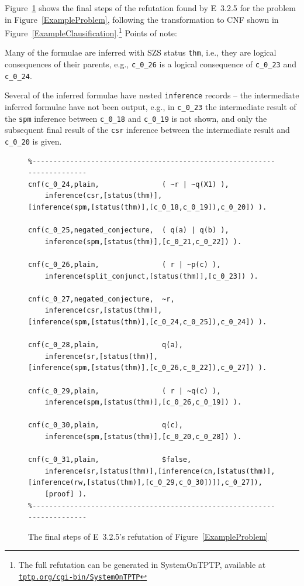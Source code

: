 \documentclass{ceurart}
\newcommand{\smalltt}[1]{\small \texttt{#1}}
\newenvironment{packed_itemize}{
\vspace*{-0.3em}
\begin{itemize}
\setlength{\partopsep}{0pt}
\setlength{\itemsep}{1pt}
\setlength{\parskip}{0pt}
\setlength{\parsep}{0pt}
}{\end{itemize}}
\begin{document}
Figure~\ref{ExampleDerivation} shows the final steps of the refutation found by E~3.2.5 for the
problem in Figure~\ref{ExampleProblem}, following the transformation to CNF shown in 
Figure~\ref{ExampleClausification}.\footnote{%
The full refutation can be generated in SystemOnTPTP, available at
\href{https://tptp.org/cgi-bin/SystemOnTPTP}{\tt tptp.org/cgi-bin/SystemOnTPTP}}
Points of note:
\begin{packed_itemize}
\item Many of the formulae are inferred with SZS status \smalltt{thm}, i.e., they are logical 
      consequences of their parents, e.g., \smalltt{c\_0\_26} is a logical consequence of
      \smalltt{c\_0\_23} and \smalltt{c\_0\_24}.
\item Several of the inferred formulae have nested \smalltt{inference} records -- the intermediate 
      inferred formulae have not been output, e.g., in \smalltt{c\_0\_23} the intermediate result
      of the \smalltt{spm} inference between \smalltt{c\_0\_18} and \smalltt{c\_0\_19} is not
      shown, and only the subsequent final result of the \smalltt{csr} inference between the
      intermediate result and \smalltt{c\_0\_20} is given.
\end{packed_itemize}

\begin{figure}[htb]
\centering
{\footnotesize
{\setlength{\baselineskip}{4mm}
\begin{verbatim}
%------------------------------------------------------------------------
cnf(c_0_24,plain,               ( ~r | ~q(X1) ),
    inference(csr,[status(thm)],
[inference(spm,[status(thm)],[c_0_18,c_0_19]),c_0_20]) ).

cnf(c_0_25,negated_conjecture,  ( q(a) | q(b) ),
    inference(spm,[status(thm)],[c_0_21,c_0_22]) ).

cnf(c_0_26,plain,               ( r | ~p(c) ),
    inference(split_conjunct,[status(thm)],[c_0_23]) ).

cnf(c_0_27,negated_conjecture,  ~r,
    inference(csr,[status(thm)],
[inference(spm,[status(thm)],[c_0_24,c_0_25]),c_0_24]) ).

cnf(c_0_28,plain,               q(a),
    inference(sr,[status(thm)],
[inference(spm,[status(thm)],[c_0_26,c_0_22]),c_0_27]) ).

cnf(c_0_29,plain,               ( r | ~q(c) ),
    inference(spm,[status(thm)],[c_0_26,c_0_19]) ).

cnf(c_0_30,plain,               q(c),
    inference(spm,[status(thm)],[c_0_20,c_0_28]) ).

cnf(c_0_31,plain,               $false,
    inference(sr,[status(thm)],[inference(cn,[status(thm)],
[inference(rw,[status(thm)],[c_0_29,c_0_30])]),c_0_27]),
    [proof] ).
%------------------------------------------------------------------------
\end{verbatim}
}}
\caption{The final steps of E~3.2.5's refutation of Figure~\ref{ExampleProblem}}
\label{ExampleDerivation}
\end{figure}
\end{document}
